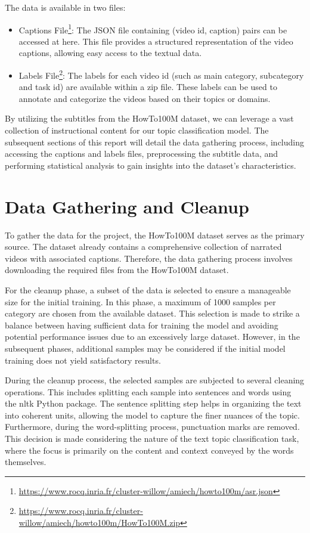 \documentclass{article}
\begin{document}
The data is available in two files:
\begin{itemize}
  \item Captions File\footnote{\url{https://www.rocq.inria.fr/cluster-willow/amiech/howto100m/asr.json}}:
  The JSON file containing (video id, caption) pairs can be accessed at here.
  This file provides a structured representation of the video captions, allowing easy access to the textual data.
  \item Labels File\footnote{\url{https://www.rocq.inria.fr/cluster-willow/amiech/howto100m/HowTo100M.zip}}:
  The labels for each video id (such as main category, subcategory and task id) are available within a zip file.
  These labels can be used to annotate and categorize the videos based on their topics or domains.
\end{itemize}

By utilizing the subtitles from the HowTo100M dataset, we can leverage a vast collection of instructional content for our topic classification model.
The subsequent sections of this report will detail the data gathering process, including accessing the captions and labels files, preprocessing the subtitle data, and performing statistical analysis to gain insights into the dataset's characteristics.

\section{Data Gathering and Cleanup}
To gather the data for the project, the HowTo100M dataset serves as the primary source.
The dataset already contains a comprehensive collection of narrated videos with associated captions.
Therefore, the data gathering process involves downloading the required files from the HowTo100M dataset.

For the cleanup phase, a subset of the data is selected to ensure a manageable size for the initial training.
In this phase, a maximum of 1000 samples per category are chosen from the available dataset.
This selection is made to strike a balance between having sufficient data for training the model and avoiding potential performance issues due to an excessively large dataset.
However, in the subsequent phases, additional samples may be considered if the initial model training does not yield satisfactory results.

During the cleanup process, the selected samples are subjected to several cleaning operations.
This includes splitting each sample into sentences and words using the nltk Python package.
The sentence splitting step helps in organizing the text into coherent units, allowing the model to capture the finer nuances of the topic.
Furthermore, during the word-splitting process, punctuation marks are removed.
This decision is made considering the nature of the text topic classification task, where the focus is primarily on the content and context conveyed by the words themselves.
\end{document}
